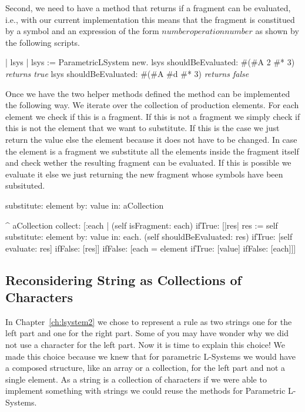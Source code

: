 Second, we need to have a method that returns  if a fragment
can be evaluated, i.e., with our current implementation this means
that the fragment is constitued by a symbol and an expression of the
form $number operation number$ as shown by the following scripts.

\begin{scriptwithouttitle}
| lsys |
lsys := ParametricLSystem new.
lsys shouldBeEvaluated: #(#A 2 #* 3)
\emph{returns true}
lsys shouldBeEvaluated: #(#A #d #* 3)
\emph{returns false}
\end{scriptwithouttitle}

Once we have the two helper methods defined the method
 can be implemented the following way. We
iterate over the collection of production elements. For each element
we check if this is a fragment. If this is not a fragment we simply
check if this is not the element that we want to substitute. If this
is the case we just return the value else the element because it does
not have to be changed. In case the element is a fragment we
substitute all the elements inside the fragment itself and check
wether the resulting fragment can be evaluated. If this is possible we
evaluate it else we just returning the new fragment whose symbols have
been subsituted.

\begin{method}
substitute: element by: value in: aCollection
                
   ^ aCollection 
        collect: [:each | 
                    (self isFragment: each) 
                       ifTrue: [|res|
                                res := self substitute: element 
                                            by: value 
                                            in: each.
                                (self shouldBeEvaluated: res) 
                                   ifTrue: [self evaluate: res]
                                   ifFalse: [res]]
                       ifFalse: [each = element
                                  ifTrue: [value]
                                  ifFalse: [each]]]
\end{method}


\subsection{Reconsidering String as Collections of Characters}\label{sec:stringascol}
In Chapter~\ref{ch:lsystem2} we chose to represent a rule as two
strings one for the left part and one for the right part. Some of you
may have wonder why we did not use a character for the left part.  Now
it is time to explain this choice! We made this choice because we knew
that for parametric L-Systems we would have a composed structure, like
an array or a collection, for the left part and not a single element.
As a string is a collection of characters if we were able to implement
something with strings we could reuse the methods for Parametric
L-Systems.

